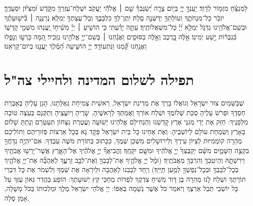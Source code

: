 \documentclass[a4paper, twoside, openany, parskip=half, 10pt]{article}
\begin{document}
\begin{multicols}{2}
לַמְנַצֵּ֗חַ מִזְמ֥וֹר לְדָוִֽד׃
 יַֽעַנְךָ֣ יְיָ֭ בְּי֣וֹם צָרָ֑ה יְ֝שַׂגֶּבְךָ֗ שֵׁ֤ם ׀ אֱלֹהֵ֬י יַעֲקֹֽב׃
 יִשְׁלַֽח־עֶזְרְךָ֥ מִקֹּ֑דֶשׁ וּ֝מִצִּיּ֗וֹן יִסְעָדֶֽךָּ׃
 יִזְכֹּ֥ר כָּל־מִנְחֹתֶ֑ךָ וְעוֹלָתְךָ֖ יְדַשְּׁנֶ֣ה סֶֽלָה׃
 יִֽתֶּן־לְךָ֥ כִלְבָבֶ֑ךָ וְֽכָל־עֲצָתְךָ֥ יְמַלֵּֽא׃
 נְרַנְּנָ֤ה ׀ בִּ֘ישׁ֤וּעָתֶ֗ךָ וּבְשֵֽׁם־אֱלֹהֵ֥ינוּ נִדְגֹּ֑ל יְמַלֵּ֥א יְ֝יָ֗ כָּל־מִשְׁאֲלוֹתֶֽיךָ׃
 עַתָּ֤ה יָדַ֗עְתִּי כִּ֤י הוֹשִׁ֥יעַ ׀ יְיָ֗ מְשִׁ֫יח֥וֹ יַ֭עֲנֵהוּ מִשְּׁמֵ֣י קָדְשׁ֑וֹ בִּ֝גְבֻר֗וֹת יֵ֣שַׁע יְמִינֽוֹ׃
 אֵ֣לֶּה בָ֭רֶכֶב וְאֵ֣לֶּה בַסּוּסִ֑ים וַאֲנַ֓חְנוּ ׀ בְּשֵׁם־יְיָ֖ אֱלֹהֵ֣ינוּ נַזְכִּֽיר׃
 הֵ֭מָּה כָּרְע֣וּ וְנָפָ֑לוּ וַאֲנַ֥חְנוּ קַּ֝֗מְנוּ וַנִּתְעוֹדָֽד׃
 יְיָ֥ הוֹשִׁ֑יעָה הַ֝מֶּ֗לֶךְ יַעֲנֵ֥נוּ בְיוֹם־קָרְאֵֽנוּ׃

\end{multicols}

\section*{תפילה לשלום המדינה ולחיילי צה"ל}

 שֶׁבַּשָּׁמַיִם צוּר יִשְׂרָאֵל וְגוֹאֲלוֹ בָּרֵךְ אֶת מְדִינַת יִשְׂרָאֵל, רֵאשִׁית צְמִיחַת גְּאֻלָּתֵנוּ, הָגֵן עָלֶיהָ בְּאֶבְרַת חַסְדֶּךָ וּפְרֹשׂ עָלֶיהָ סֻכַּת שְׁלוֹמֶךָ וּשְׁלַח אוֹרְךָ וַאֲמִתְּךָ לְרָאשֶׁיהָ, שָׂרֶיהָ וְיוֹעֲצֶיהָ וְתַקְּנֵם בְּעֵצָה טוֹבָה מִלְּפָנֶיךָ: חַזֵּק אֶת יְדֵי מְגִנֵּי אֶרֶץ קׇדְשֵׁנוּ וְהַנְחִילֵם אֱלֹהֵינוּ יְשׁוּעָה וַעֲטֶרֶת נִצָּחוֹן תְּעַטְּרֵם וְנָתַתָּ שָׁלוֹם בָּאָרֶץ וְשִׂמְחַת עוֹלָם לְיוֹשְׁבֶיהָ:
וְאֶת אַחֵינוּ כָּל בֵּית יִשְׂרָאֵל פְּקׇד נָא בְּכָל אַרְצוֹת פְּזוּרֵיהֶם וְתוֹלִיכֵם מְהֵרָה קוֹמְמִיּוּת לְצִיּוֹן עִירֶךָ וְלִירוּשָׁלַיִם מִשְׁכַּן שְׁמֶךָ, כַּכָּתוּב בְּתוֹרַת מֹשֶׁה עַבְדֶּךָ:
אִם־יִהְיֶ֥ה נִֽדַּחֲךָ֖ בִּקְצֵ֣ה הַשָּׁמָ֑יִם מִשָּׁ֗ם יְקַבֶּצְךָ֙ יְיָ֣ אֱלֹהֶ֔יךָ וּמִשָּׁ֖ם יִקָּחֶֽךָ׃
וֶהֱבִיאֲךָ֞ יְיָ֣ אֱלֹהֶ֗יךָ אֶל־הָאָ֛רֶץ אֲשֶׁר־יָרְשׁ֥וּ אֲבֹתֶ֖יךָ וִֽירִשְׁתָּ֑הּ וְהֵיטִֽבְךָ֥ וְהִרְבְּךָ֖ מֵאֲבֹתֶֽיךָ׃ 
(וּמָ֨ל יְיָ֧ אֱלֹהֶ֛יךָ אֶת־לְבָבְךָ֖ וְאֶת־לְבַ֣ב זַרְעֶ֑ךָ לְאַהֲבָ֞ה אֶת־יְיָ֧ אֱלֹהֶ֛יךָ בְּכׇל־לְבָבְךָ֥ וּבְכׇל־נַפְשְׁךָ֖ לְמַ֥עַן חַיֶּֽיךָ׃)
וְיַחֵד לְבָבֵנוּ לְאַהֲבָה וּלְיִרְאָה אֶת שְׁמֶךָ וְלִשְׁמֹר אֶת כׇּל דִּבְרֵי תּוֹרָתֶךָ וּשְׁלַח לָנוּ מְהֵרָה בֶּן דָּוִד מְשִׁיחַ צִדְקֶךָ לִפְדּוֹת מְחַכֵּי קֵץ יְשׁוּעָתֶךָ: הוֹפַע בַּהֲדַר גְּאוֹן עֻזֶּךָ עַל כׇּל יוֹשְׁבֵי תֵּבֵל אַרְצֶךָ וְיֹאמַר כֹּל אֲשֶׁר נְשָׁמָה בְּאַפּוֹ:
יְיָ אֱלֹהֵי יִשְׂרָאֵל מֶלֶךְ וּמַלְכוּתוֹ בַּכֹּל מָשָׁלָה, אָמֵן סֶלָה. \\
\end{document}
